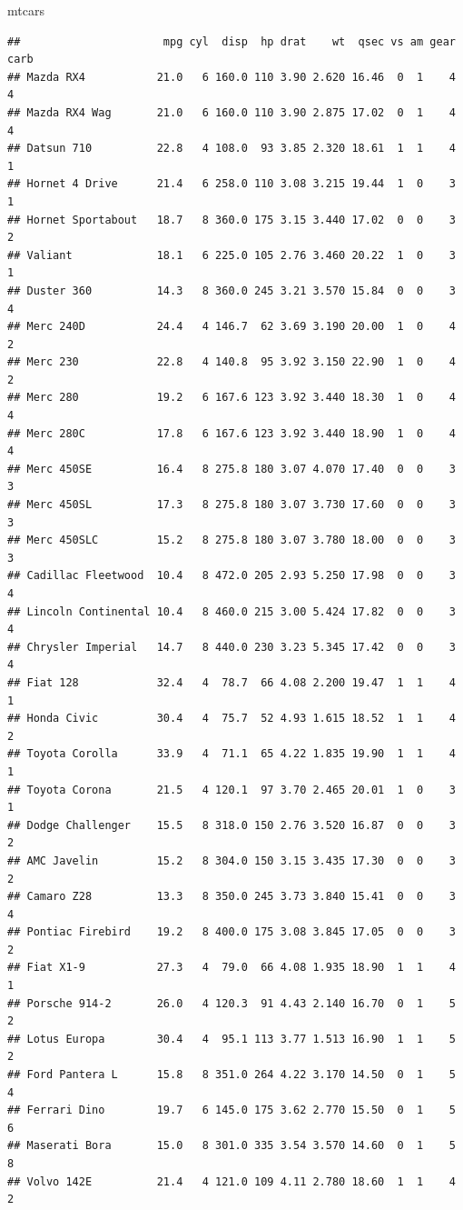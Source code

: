 \documentclass[
]{book}
\newenvironment{Shaded}{\begin{snugshade}}{\end{snugshade}}
\newcommand{\NormalTok}[1]{#1}
\theoremstyle{definition}
\theoremstyle{definition}
\theoremstyle{definition}
\theoremstyle{definition}
\theoremstyle{remark}
\begin{document}
\begin{Shaded}
\begin{Highlighting}[]
\NormalTok{mtcars}
\end{Highlighting}
\end{Shaded}

\begin{verbatim}
##                      mpg cyl  disp  hp drat    wt  qsec vs am gear carb
## Mazda RX4           21.0   6 160.0 110 3.90 2.620 16.46  0  1    4    4
## Mazda RX4 Wag       21.0   6 160.0 110 3.90 2.875 17.02  0  1    4    4
## Datsun 710          22.8   4 108.0  93 3.85 2.320 18.61  1  1    4    1
## Hornet 4 Drive      21.4   6 258.0 110 3.08 3.215 19.44  1  0    3    1
## Hornet Sportabout   18.7   8 360.0 175 3.15 3.440 17.02  0  0    3    2
## Valiant             18.1   6 225.0 105 2.76 3.460 20.22  1  0    3    1
## Duster 360          14.3   8 360.0 245 3.21 3.570 15.84  0  0    3    4
## Merc 240D           24.4   4 146.7  62 3.69 3.190 20.00  1  0    4    2
## Merc 230            22.8   4 140.8  95 3.92 3.150 22.90  1  0    4    2
## Merc 280            19.2   6 167.6 123 3.92 3.440 18.30  1  0    4    4
## Merc 280C           17.8   6 167.6 123 3.92 3.440 18.90  1  0    4    4
## Merc 450SE          16.4   8 275.8 180 3.07 4.070 17.40  0  0    3    3
## Merc 450SL          17.3   8 275.8 180 3.07 3.730 17.60  0  0    3    3
## Merc 450SLC         15.2   8 275.8 180 3.07 3.780 18.00  0  0    3    3
## Cadillac Fleetwood  10.4   8 472.0 205 2.93 5.250 17.98  0  0    3    4
## Lincoln Continental 10.4   8 460.0 215 3.00 5.424 17.82  0  0    3    4
## Chrysler Imperial   14.7   8 440.0 230 3.23 5.345 17.42  0  0    3    4
## Fiat 128            32.4   4  78.7  66 4.08 2.200 19.47  1  1    4    1
## Honda Civic         30.4   4  75.7  52 4.93 1.615 18.52  1  1    4    2
## Toyota Corolla      33.9   4  71.1  65 4.22 1.835 19.90  1  1    4    1
## Toyota Corona       21.5   4 120.1  97 3.70 2.465 20.01  1  0    3    1
## Dodge Challenger    15.5   8 318.0 150 2.76 3.520 16.87  0  0    3    2
## AMC Javelin         15.2   8 304.0 150 3.15 3.435 17.30  0  0    3    2
## Camaro Z28          13.3   8 350.0 245 3.73 3.840 15.41  0  0    3    4
## Pontiac Firebird    19.2   8 400.0 175 3.08 3.845 17.05  0  0    3    2
## Fiat X1-9           27.3   4  79.0  66 4.08 1.935 18.90  1  1    4    1
## Porsche 914-2       26.0   4 120.3  91 4.43 2.140 16.70  0  1    5    2
## Lotus Europa        30.4   4  95.1 113 3.77 1.513 16.90  1  1    5    2
## Ford Pantera L      15.8   8 351.0 264 4.22 3.170 14.50  0  1    5    4
## Ferrari Dino        19.7   6 145.0 175 3.62 2.770 15.50  0  1    5    6
## Maserati Bora       15.0   8 301.0 335 3.54 3.570 14.60  0  1    5    8
## Volvo 142E          21.4   4 121.0 109 4.11 2.780 18.60  1  1    4    2
\end{verbatim}
\end{document}
